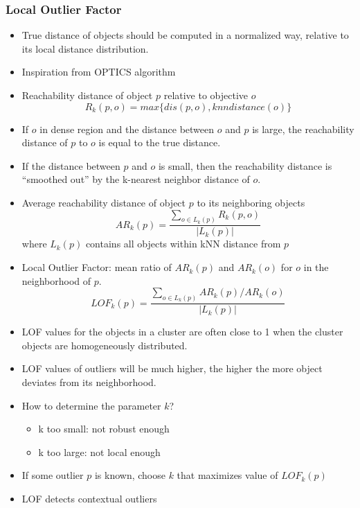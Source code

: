 \documentclass{article}
\begin{document}
\subsubsection{Local Outlier Factor}
\begin{itemize}
  \item True distance of objects should be computed in a normalized way, relative to its local distance distribution.
  \item Inspiration from OPTICS algorithm
  \item Reachability distance of object $p$ relative to objective $o$
  $$R_k(p, o) = max\{dis(p, o), knndistance(o)\}$$
  \item If $o$ in dense region and the distance between $o$ and $p$ is large, the reachability distance of $p$ to $o$ is equal to the true distance.
  \item If the distance between $p$ and $o$ is small, then the reachability distance is ``smoothed out'' by the k-nearest neighbor distance of $o$.
  \item Average reachability distance of object $p$ to its neighboring objects
  $$AR_k(p) = \frac{\sum_{o \in L_k(p)} R_k(p, o)}{|L_k(p)|}$$
  where $L_k(p)$ contains all objects within kNN distance from $p$
  \item Local Outlier Factor: mean ratio of $AR_k(p)$ and $AR_k(o)$ for $o$ in the neighborhood of $p$.
  $$LOF_k(p) = \frac{\sum_{o \in L_k(p)}AR_k(p) / AR_k(o)}{|L_k(p)|}$$
  \item LOF values for the objects in a cluster are often close to 1 when the cluster objects are homogeneously distributed.
  \item LOF values of outliers will be much higher, the higher the more object deviates from its neighborhood.
  \item How to determine the parameter $k$?
  \begin{itemize}
    \item k too small: not robust enough
    \item k too large: not local enough
  \end{itemize}
  \item If some outlier $p$ is known, choose $k$ that maximizes value of $LOF_k(p)$
  \item LOF detects contextual outliers
\end{itemize}

\newpage
\end{document}
